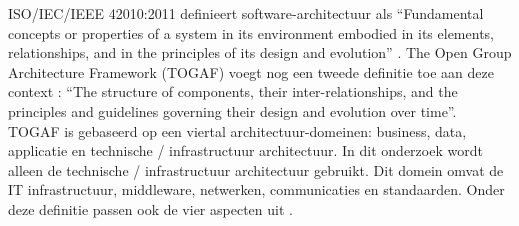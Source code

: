 ISO/IEC/IEEE 42010:2011 definieert software-architectuur als \enquote{Fundamental concepts or properties of a system in its environment embodied in its elements, relationships, and in the principles of its design and evolution} \parencite{IEEEArchitecture}. The Open Group Architecture Framework (TOGAF) voegt nog een tweede definitie toe aan deze context \parencite{ArchitectureTOGAF}: \enquote{The structure of components, their inter-relationships, and the principles and guidelines governing their design and evolution over time}. TOGAF is gebaseerd op een viertal architectuur-domeinen: business, data, applicatie en technische / infrastructuur architectuur. In dit onderzoek wordt alleen de technische / infrastructuur architectuur gebruikt. Dit domein omvat de IT infrastructuur, middleware, netwerken, communicaties en standaarden. Onder deze definitie passen ook de vier aspecten uit \parencite{ArchitectureInPractice}.
